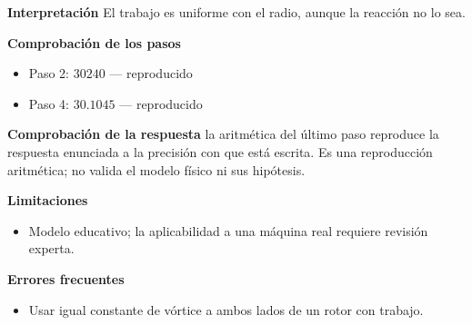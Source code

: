 \documentclass[10pt,openany]{book}
\begin{document}
\begin{tcolorbox}[title={Problema resuelto 2}, studiumworked, breakable]
\noindent\textbf{Interpretación}
El trabajo es uniforme con el radio, aunque la reacción no lo sea.

\noindent\textbf{Comprobación de los pasos}
\begin{itemize}
\item Paso 2: $30240$ — reproducido
\item Paso 4: $30.1045$ — reproducido
\end{itemize}

\noindent\textbf{Comprobación de la respuesta} la aritmética del último paso reproduce la respuesta enunciada a la precisión con que está escrita. Es una reproducción aritmética; no valida el modelo físico ni sus hipótesis.

\noindent\textbf{Limitaciones}
\begin{itemize}
\item Modelo educativo; la aplicabilidad a una máquina real requiere revisión experta.
\end{itemize}

\noindent\textbf{Errores frecuentes}
\begin{itemize}
\item Usar igual constante de vórtice a ambos lados de un rotor con trabajo.
\end{itemize}
\end{tcolorbox}
\end{document}
